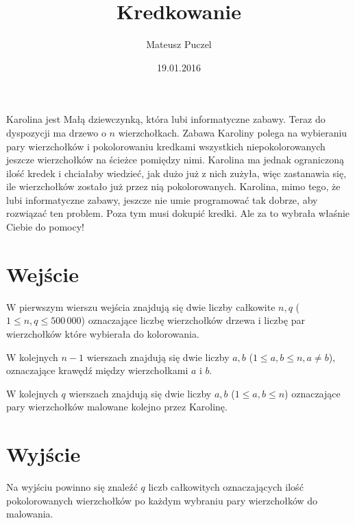 \documentclass[zad,zawodnik,utf8]{sinol}
\title{Kredkowanie}
\author{Mateusz Puczel} %
\date{19.01.2016}
\begin{document}
\begin{tasktext}%
Karolina jest Małą dziewczynką, która lubi informatyczne zabawy. Teraz do dyspozycji ma drzewo o $n$ wierzchołkach. Zabawa Karoliny polega na wybieraniu pary wierzchołków i pokolorowaniu kredkami wszystkich niepokolorowanych jeszcze wierzchołków na ścieżce pomiędzy nimi. Karolina ma jednak ograniczoną ilość kredek i chciałaby wiedzieć, jak dużo już z nich zużyła, więc zastanawia się, ile wierzchołków zostało już przez nią pokolorowanych.
Karolina, mimo tego, że lubi informatyczne zabawy, jeszcze nie umie programować tak dobrze, aby rozwiązać ten problem. Poza tym musi dokupić kredki. Ale za to wybrała właśnie Ciebie do pomocy!

  \section{Wejście}
W pierwszym wierszu wejścia znajdują się dwie liczby całkowite $n, q$ ($1 \leq n, q\leq 500\,000$) oznaczające liczbę wierzchołków drzewa i liczbę par wierzchołków które wybierała do kolorowania.

W kolejnych $n - 1$ wierszach znajdują się dwie liczby $a, b$ ($1 \leq a, b \leq n, a \neq b$), oznaczające krawędź między wierzchołkami $a$ i $b$.

W kolejnych $q$ wierszach znajdują się dwie liczby $a, b$ ($1 \leq a, b \leq n$) oznaczające pary wierzchołków malowane kolejno przez Karolinę.

  \section{Wyjście}
Na wyjściu powinno się znaleźć $q$ liczb całkowitych oznaczających ilość pokolorowanych wierzchołków po każdym wybraniu pary wierzchołków do malowania.

\makecompactexample

\end{tasktext}
\end{document}
